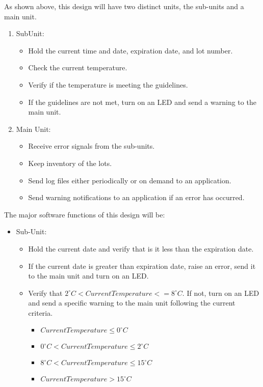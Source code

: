 \newpage
As shown above, this design will have two distinct units, the sub-units and a main unit.\\
\begin{enumerate}
  \item Sub\-Unit:
        \begin{itemize}
          \item Hold the current time and date, expiration date, and lot number.
          \item Check the current temperature.
          \item Verify if the temperature is meeting the guidelines.
          \item If the guidelines are not met, turn on an LED and send a warning
                to the main unit.
        \end{itemize}
  \item Main Unit:
        \begin{itemize}
          \item Receive error signals from the sub-units.
          \item Keep inventory of the lots.
          \item Send log files either periodically or on demand to an
                application.
          \item Send warning notifications to an application if an error has
                occurred.
        \end{itemize}
\end{enumerate}
The major software functions of this design will be:
\begin{itemize}
  \item Sub-Unit:
        \begin{itemize}
          \item Hold the current date and verify that is it less than the
                expiration date.
          \item If the current date is greater than expiration date, raise an
                error, send it to the main unit and turn on an LED.
          \item Verify that
                \textnormal{$2^{\circ}C < Current Temperature <= 8^{\circ}C$}.
                If not, turn on an LED and send a specific warning to the main
                unit following the current criteria\cite{ManagingInsulinEmergency2021}.
                \begin{itemize}
                  \item \textnormal{$Current Temperature \leq 0^{\circ}C$}
                  \item
                        \textnormal{$0^{\circ}C < Current Temperature \leq 2^{\circ}C$}
                  \item
                        \textnormal{$8^{\circ}C < Current Temperature \leq 15^{\circ}C$}
                  \item \textnormal{$Current Temperature > 15^{\circ}C$}
                \end{itemize}
        \end{itemize}
\end{itemize}
